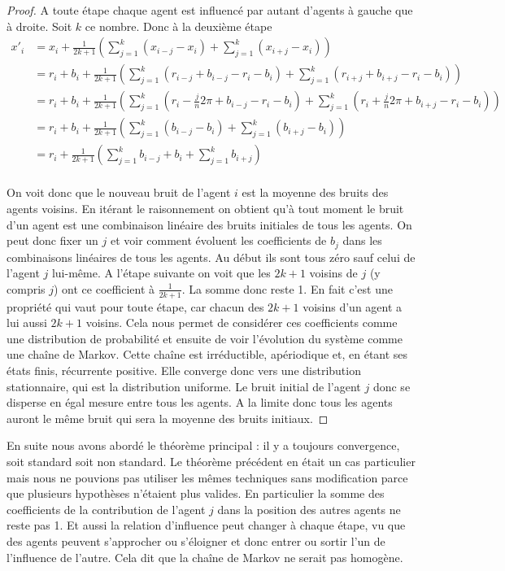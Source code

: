 \documentclass[a4paper,10pt]{article}
\begin{document}
\begin{proof}
A toute étape chaque agent est influencé par autant d'agents à gauche que à droite. Soit $k$ ce nombre. Donc à la deuxième étape
\begin{equation*}
\begin{split}
x'_i &= x_i + \frac{1}{2k+1} \left( \sum_{j=1}^k (x_{i-j} - x_i) + \sum_{j=1}^k (x_{i+j} - x_i) \right) \\
     &= r_i + b_i + \frac{1}{2k+1} \left( \sum_{j=1}^k (r_{i-j} + b_{i-j} - r_i - b_i) + \sum_{j=1}^k (r_{i+j} + b_{i+j} - r_i - b_i) \right) \\
     &= r_i + b_i + \frac{1}{2k+1} \left( \sum_{j=1}^k (r_i - \frac{j}{n}2 \pi + b_{i-j} - r_i - b_i) + \sum_{j=1}^k (r_i + \frac{j}{n}2 \pi + b_{i+j} - r_i - b_i) \right) \\
     &= r_i + b_i + \frac{1}{2k+1} \left( \sum_{j=1}^k (b_{i-j} - b_i) + \sum_{j=1}^k (b_{i+j} - b_i) \right) \\
     &= r_i + \frac{1}{2k+1} \left( \sum_{j=1}^k b_{i-j} + b_i + \sum_{j=1}^k b_{i+j} \right) \\
\end{split}
\end{equation*}

On voit donc que le nouveau bruit de l'agent $i$ est la moyenne des bruits des agents voisins. En itérant le raisonnement on obtient qu'à tout moment le bruit d'un agent est une combinaison linéaire des bruits initiales de tous les agents. On peut donc fixer un $j$ et voir comment évoluent les coefficients de $b_j$ dans les combinaisons linéaires de tous les agents. Au début ils sont tous zéro sauf celui de l'agent $j$ lui-même. A l’étape suivante on voit que les $2k+1$ voisins de $j$ (y compris $j$) ont ce coefficient à $\frac{1}{2k+1}$. La somme donc reste 1. En fait c'est une propriété qui vaut pour toute étape, car chacun des $2k+1$ voisins d'un agent a lui aussi $2k+1$ voisins. Cela nous permet de considérer ces coefficients comme une distribution de probabilité et ensuite de voir l’évolution du système comme une chaîne de Markov. Cette chaîne est irréductible, apériodique et, en étant ses états finis, récurrente positive. Elle converge donc vers une distribution stationnaire, qui est la distribution uniforme. Le bruit initial de l'agent $j$ donc se disperse en égal mesure entre tous les agents. A la limite donc tous les agents auront le même bruit qui sera la moyenne des bruits initiaux.
\end{proof}

En suite nous avons abordé le théorème principal : il y a toujours convergence, soit standard soit non standard. Le théorème précédent en était un cas particulier mais nous ne pouvions pas utiliser les mêmes techniques sans modification parce que plusieurs hypothèses n’étaient plus valides. En particulier la somme des coefficients de la contribution de l'agent $j$ dans la position des autres agents ne reste pas 1. Et aussi la relation d'influence peut changer à chaque étape, vu que des agents peuvent s'approcher ou s’éloigner et donc entrer ou sortir l'un de l'influence de l'autre. Cela dit que la chaîne de Markov ne serait pas homogène.
\end{document}
